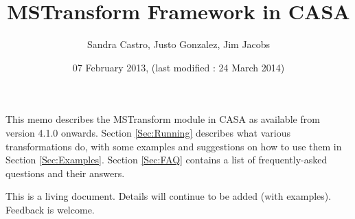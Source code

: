 \documentclass[11pt]{article}
\begin{document}
\title{MSTransform Framework in CASA}
\author{Sandra Castro, Justo Gonzalez, Jim Jacobs}
\date{07 February 2013, (last modified : 24 March 2014)}
\maketitle

This memo describes the MSTransform module in CASA as available from version
4.1.0 onwards.
Section \ref{Sec:Running} 
describes what 
various transformations do, with some examples and suggestions on how to use them in
Section \ref{Sec:Examples}. 
Section \ref{Sec:FAQ} contains a list of frequently-asked questions and their answers.

This is a living document. Details will continue to be added (with examples). Feedback is welcome.

\tableofcontents

%


\end{document}

